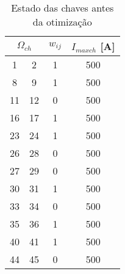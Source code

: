 \begin{table}[H]
    \centering
    \caption{Estado das chaves antes da otimização}
    \label{tab:est_chave_atual}
    \begin{tabular}{|c|c|c|c|}
        \hline
        \multicolumn{2}{|c|}{$\Omega_{ch}$} & $w_{ij}$ & $I_{maxch}$ [A]\\ \hline
         1 &   2 &  1 &   500\\ \hline
         8 &   9 &  1 &   500\\ \hline
        11 &  12 &  0 &   500\\ \hline
        16 &  17 &  1 &   500\\ \hline
        23 &  24 &  1 &   500\\ \hline
        26 &  28 &  0 &   500\\ \hline
        27 &  29 &  0 &   500\\ \hline
        30 &  31 &  1 &   500\\ \hline
        33 &  34 &  0 &   500\\ \hline
        35 &  36 &  1 &   500\\ \hline
        40 &  41 &  1 &   500\\ \hline
        44 &  45 &  0 &   500\\ \hline
    \end{tabular}
\end{table}